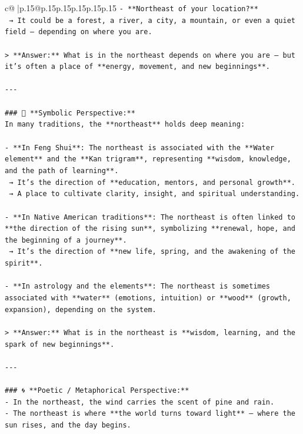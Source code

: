 \documentclass{article}
\begin{document}
{\begin{supertabular}{c@{$\;$}|p{.15\linewidth}@{}p{.15\linewidth}p{.15\linewidth}p{.15\linewidth}p{.15\linewidth}p{.15\linewidth}}
{{{\texttt{{-} **Northeast of your location?**  } \\
\texttt{  → It could be a forest, a river, a city, a mountain, or even a quiet field — depending on where you are.} \\
\\ 
\texttt{> **Answer:** What is in the northeast depends on where you are — but it’s often a place of **energy, movement, and new beginnings**.} \\
\\ 
\texttt{{-}{-}{-}} \\
\\ 
\texttt{\#\#\# 🌌 **Symbolic Perspective:**} \\
\texttt{In many traditions, the **northeast** holds deep meaning:} \\
\\ 
\texttt{{-} **In Feng Shui**: The northeast is associated with the **Water element** and the **Kan trigram**, representing **wisdom, knowledge, and the path of learning**.  } \\
\texttt{  → It’s the direction of **education, mentors, and personal growth**.  } \\
\texttt{  → A place to cultivate clarity, insight, and spiritual understanding.} \\
\\ 
\texttt{{-} **In Native American traditions**: The northeast is often linked to **the direction of the rising sun**, symbolizing **renewal, hope, and the beginning of a journey**.  } \\
\texttt{  → It’s the direction of **new life, spring, and the awakening of the spirit**.} \\
\\ 
\texttt{{-} **In astrology and the elements**: The northeast is sometimes associated with **water** (emotions, intuition) or **wood** (growth, expansion), depending on the system.} \\
\\ 
\texttt{> **Answer:** What is in the northeast is **wisdom, learning, and the spark of new beginnings**.} \\
\\ 
\texttt{{-}{-}{-}} \\
\\ 
\texttt{\#\#\# 🌀 **Poetic / Metaphorical Perspective:**} \\
\texttt{{-} In the northeast, the wind carries the scent of pine and rain.  } \\
\texttt{{-} The northeast is where **the world turns toward light** — where the sun rises, and the day begins.  } \\
}}}
\end{supertabular}}
\end{document}
